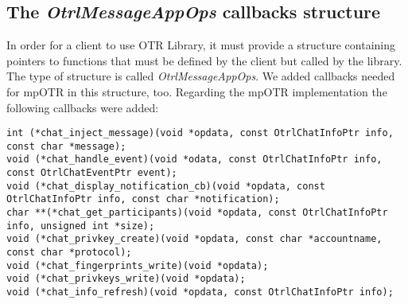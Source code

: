 \subsection{The \emph{OtrlMessageAppOps} callbacks structure}
\label{section:callbacks_structure}
In order for a client to use OTR Library, it must provide a structure containing pointers to functions that must be defined by the client but called by the library. The type of structure is called \emph{OtrlMessageAppOps}. We added callbacks needed for mpOTR in this structure, too. Regarding the mpOTR implementation the following callbacks were added:

\begin{lstlisting}[caption={mpOTR callbacks in OtrlMessageAppOps}]
int (*chat_inject_message)(void *opdata, const OtrlChatInfoPtr info, const char *message);
void (*chat_handle_event)(void *odata, const OtrlChatInfoPtr info, const OtrlChatEventPtr event);
void (*chat_display_notification_cb)(void *opdata, const OtrlChatInfoPtr info, const char *notification);
char **(*chat_get_participants)(void *opdata, const OtrlChatInfoPtr info, unsigned int *size);
void (*chat_privkey_create)(void *opdata, const char *accountname, const char *protocol);
void (*chat_fingerprints_write)(void *opdata);
void (*chat_privkeys_write)(void *opdata);
void (*chat_info_refresh)(void *opdata, const OtrlChatInfoPtr info);
\end{lstlisting}

